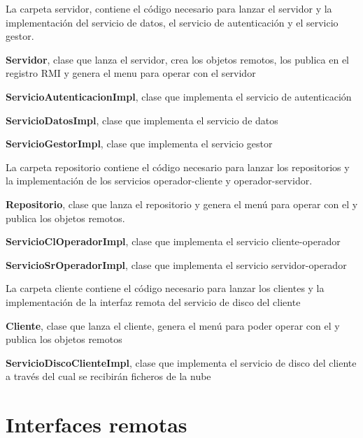 La carpeta servidor, contiene el código necesario para lanzar el servidor y la implementación del servicio de datos, el servicio de autenticación y el servicio gestor.
\begin{compactitem}
	\item \textbf{Servidor}, clase que lanza el servidor, crea los objetos remotos, los publica en el registro RMI y genera el menu para operar con el servidor
	\item \textbf{ServicioAutenticacionImpl}, clase que implementa el servicio de autenticación
	\item \textbf{ServicioDatosImpl}, clase que implementa el servicio de datos
	\item \textbf{ServicioGestorImpl}, clase que implementa el servicio gestor
\end{compactitem}

La carpeta repositorio contiene el código necesario para lanzar los repositorios y la implementación de los servicios operador-cliente y operador-servidor.

\begin{compactitem}
	\item \textbf{Repositorio}, clase que lanza el repositorio y genera el menú para operar con el y publica los objetos remotos.
	\item \textbf{ServicioClOperadorImpl}, clase que implementa el servicio cliente-operador
	\item \textbf{ServicioSrOperadorImpl}, clase que implementa el servicio servidor-operador
\end{compactitem}

La carpeta cliente contiene el código necesario para lanzar los clientes y la implementación de la interfaz remota del servicio de disco del cliente

\begin{compactitem}
	\item \textbf{Cliente}, clase que lanza el cliente, genera el menú para poder operar con el y publica los objetos remotos
	\item \textbf{ServicioDiscoClienteImpl}, clase que implementa el servicio de disco del cliente a través del cual se recibirán ficheros de la nube
\end{compactitem}

\pagebreak

\section{Interfaces remotas}


